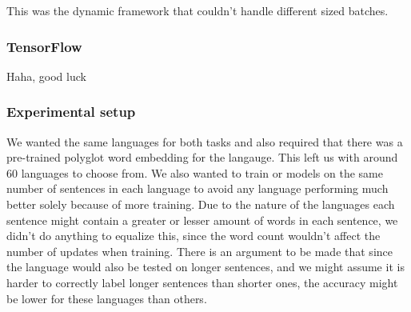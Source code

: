 This was the dynamic framework that couldn't handle different sized batches.


\subsubsection*{TensorFlow}

Haha, good luck



\subsubsection{Experimental setup}

We wanted the same languages for both tasks and also required that there was a
pre-trained polyglot word embedding for the langauge. This left us with around
60 languages to choose from. We also wanted to train or models on the same
number of sentences in each language to avoid any language performing much
better solely because of more training. Due to the nature of the languages each
sentence might contain a greater or lesser amount of words in each sentence, we
didn't do anything to equalize this, since the word count wouldn't affect the
number of updates when training. There is an argument to be made that since the
language would also be tested on longer sentences, and we might assume it is
harder to correctly label longer sentences than shorter ones, the accuracy might
be lower for these languages than others. 



\pagebreak
